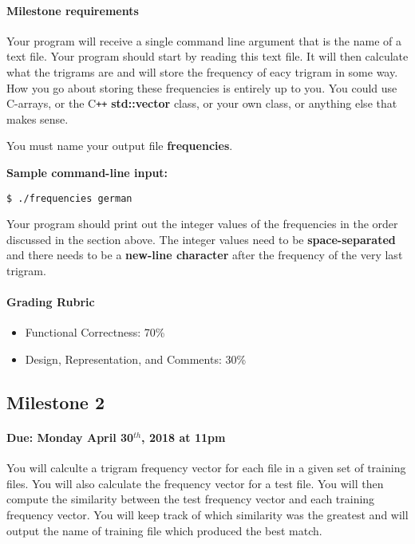 \documentclass[]{article}
\providecommand{\tightlist}{%
  \setlength{\itemsep}{0pt}\setlength{\parskip}{0pt}}
\let\oldparagraph\paragraph
\renewcommand{\paragraph}[1]{\oldparagraph{#1}\mbox{}}
\begin{document}
\paragraph{Milestone requirements}\label{milestone-requirements}

Your program will receive a single command line argument that is the
name of a text file. Your program should start by reading this text
file. It will then calculate what the trigrams are and will store the
frequency of eacy trigram in some way. How you go about storing these
frequencies is entirely up to you. You could use C-arrays, or the C\texttt{++}
\textbf{std::vector} class, or your own class, or anything else that
makes sense.

You must name your output file \textbf{frequencies}.

\textbf{Sample command-line input:}

\texttt{\$ ./frequencies german}

Your program should print out the integer values of the frequencies in
the order discussed in the section above. The integer values need to be
\textbf{space-separated} and there needs to be a \textbf{new-line
character} after the frequency of the very last trigram.

\paragraph{Grading Rubric}\label{grading-rubric}

\begin{itemize}
\tightlist
\item
  Functional Correctness: 70\%
\item
  Design, Representation, and Comments: 30\%
\end{itemize}

\subsection{Milestone 2}\label{milestone-2}

\paragraph{\texorpdfstring{Due: Monday April 30$^{th}$, 2018 at
11pm}{Due: Monday April 30$^{th}$, 2018 at 11pm}}\label{due-monday-april-30th-2018-at-11pm}

You will calculte a trigram frequency vector for each file in a given
set of training files. You will also calculate the frequency vector for
a test file. You will then compute the similarity between the test
frequency vector and each training frequency vector. You will keep track
of which similarity was the greatest and will output the name of
training file which produced the best match.
\end{document}
